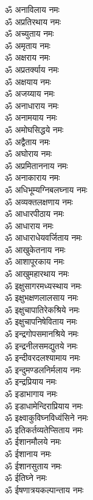 \begin{multicols}{2}
\begin{flushleft}
ॐ अनाविलाय नमः\hfill{}\\
ॐ अप्रतिरथाय नमः\\
ॐ अच्युताय नमः\\
ॐ अमृताय नमः\\
ॐ अक्षराय नमः\\
ॐ अप्रतर्क्याय नमः\\
ॐ अक्षयाय नमः\\
ॐ अजय्याय नमः\\
ॐ अनाधाराय नमः\\
ॐ अनामयाय नमः\\
ॐ अमोघसिद्धये नमः\hfill{}\\
ॐ अद्वैताय नमः\\
ॐ अघोराय नमः\\
ॐ अप्रमिताननाय नमः\\
ॐ अनाकाराय नमः\\
ॐ अधिभूम्यग्निबलघ्नाय नमः\\
ॐ अव्यक्तलक्षणाय नमः\\
ॐ आधारपीठाय नमः\\
ॐ आधाराय नमः\\
ॐ आधाराधेयवर्जिताय नमः\\
ॐ आखुकेतनाय नमः\hfill{}\\
ॐ आशापूरकाय नमः\\
ॐ आखुमहारथाय नमः\\
ॐ इक्षुसागरमध्यस्थाय नमः\\
ॐ इक्षुभक्षणलालसाय नमः\\
ॐ इक्षुचापातिरेकश्रिये नमः\\
ॐ इक्षुचापनिषेविताय नमः\\
ॐ इन्द्रगोपसमानश्रिये नमः\\
ॐ इन्द्रनीलसमद्युतये नमः\\
ॐ इन्दीवरदलश्यामाय नमः\\
ॐ इन्दुमण्डलनिर्मलाय नमः\hfill{}\\
ॐ इन्द्रप्रियाय नमः\\
ॐ इडाभागाय नमः\\
ॐ इडाधामेन्दिराप्रियाय नमः\\
ॐ इक्ष्वाकुविघ्नविध्वंसिने नमः\\
ॐ इतिकर्तव्यतेप्सिताय नमः\\
ॐ ईशानमौलये नमः\\
ॐ ईशानाय नमः\\
ॐ ईशानसुताय नमः\\
ॐ ईतिघ्ने नमः\\
ॐ ईषणात्रयकल्पान्ताय नमः\hfill{}\\

\end{flushleft}
\end{multicols}
